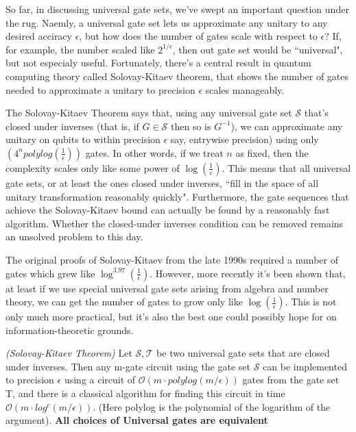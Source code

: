 So far, in discussing universal gate sets, we've swept an important question under the rug. Naemly, a universal gate set lets us approximate any unitary to any desired acciracy $\epsilon$, but how does the number of gates scale with respect to $\epsilon$? If, for example, the number scaled like $2^{1/\epsilon}$, then out gate set would be ``universal", but not especialy useful. Fortunately, there's a central result in quantum computing theory called Solovay-Kitaev theorem, that shows the number of gates needed to approximate a unitary to precision $\epsilon$ scales manageably.

The Solovay-Kitaev Theorem says that, using any universal gate set $\mathcal{S}$ that's closed under inverses (that is, if $G\in \mathcal{S}$ then so is $G^{-1}$), we can approximate any unitary on qubits to within precision $\epsilon$ say, entrywise precision) using only $(4^n polylog(\frac{1}{\epsilon}))$ gates. In other words, if we treat $n$ as fixed, then the complexity scales only like some power of $\log (\frac{1}{\epsilon})$. This means that all universal gate sets, or at least the ones closed under inverses, ``fill in the space of all unitary transformation reasonably quickly". Furthermore, the gate sequences that achieve the Solovay-Kitaev bound can actually be found by a reasonably fast algorithm. Whether the closed-under inverses condition can be removed remains an unsolved problem to this day.

The original proofs of Solovay-Kitaev from the late 1990s required a number of gates which grew like $\log^{3.97}(\frac{1}{\epsilon})$. However, more recently it's been shown that, at least if we use special universal gate sets arising from algebra and number theory, we can get the number of gates to grow only like $\log(\frac{1}{\epsilon})$. This is not only much more practical, but it's also the best one could possibly hope for on information-theoretic grounds.

\begin{theorem}
    \textit{(Solovay-Kitaev Theorem)} Let $\mathcal{S}, \mathcal{T}$ be two universal gate sets
    that are closed under inverses. Then any m-gate circuit using the gate set $\mathcal{S}$ can be implemented to precision
    $\epsilon$ using a circuit of $\mathcal{O}(m\cdot polylog(m/\epsilon))$ gates from the gate set T, and there is
    a classical algorithm for finding this circuit in time $\mathcal{O}(m\cdot log^c(m/\epsilon))$. (Here polylog is the
    polynomial of the logarithm of the argument). \textbf{All choices of Universal gates are equivalent}
\end{theorem}


